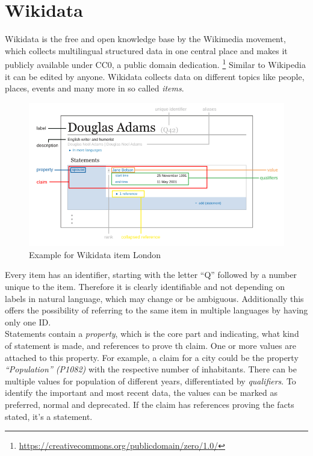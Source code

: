 \section{Wikidata}

Wikidata is the free and open knowledge base by the Wikimedia movement, which collects multilingual structured data in one central place and makes it publicly available under CC0, a public domain dedication. \footnote{\href{https://creativecommons.org/publicdomain/zero/1.0/}{https://creativecommons.org/publicdomain/zero/1.0/}} Similar to Wikipedia it can be edited by anyone. Wikidata collects data on different topics like people, places, events and many more in so called \textit{items}.
\begin{figure}[H]
	\centering
	\includegraphics[width=\textwidth]{diagrams/Wikidata_statement.png}
	\caption{Example for Wikidata item London}
	\label{diagramWikidataStatement}
\end{figure}
Every item has an identifier, starting with the letter ``Q'' followed by a number unique to the item. Therefore it is clearly identifiable and not depending on labels in natural language, which may change or be ambiguous. Additionally this offers the possibility of referring to the same item in multiple languages by having only one ID. \\
Statements contain a \textit{property}, which is the core part and indicating, what kind of statement is made, and references to prove th claim. One or more values are attached to this property. For example, a claim for a city could be the property \textit{``Population'' (P1082)} with the respective number of inhabitants. There can be multiple values for population of different years, differentiated by \textit{qualifiers}. To identify the important and most recent data, the values can be marked as preferred, normal and deprecated. If the claim has references proving the facts stated, it's a statement. \\
